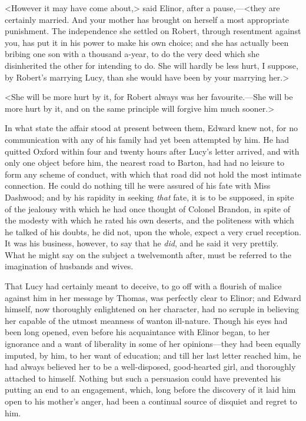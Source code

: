 <However it may have come about,> said Elinor, after a pause,—<they are certainly married. And your mother has brought on herself a most appropriate punishment. The independence she settled on Robert, through resentment against you, has put it in his power to make his own choice; and she has actually been bribing one son with a thousand a-year, to do the very deed which she disinherited the other for intending to do. She will hardly be less hurt, I suppose, by Robert's marrying Lucy, than she would have been by your marrying her.>

<She will be more hurt by it, for Robert always was her favourite.—She will be more hurt by it, and on the same principle will forgive him much sooner.>

In what state the affair stood at present between them, Edward knew not, for no communication with any of his family had yet been attempted by him. He had quitted Oxford within four and twenty hours after Lucy's letter arrived, and with only one object before him, the nearest road to Barton, had had no leisure to form any scheme of conduct, with which that road did not hold the most intimate connection. He could do nothing till he were assured of his fate with Miss Dashwood; and by his rapidity in seeking \textit{that} fate, it is to be supposed, in spite of the jealousy with which he had once thought of Colonel Brandon, in spite of the modesty with which he rated his own deserts, and the politeness with which he talked of his doubts, he did not, upon the whole, expect a very cruel reception. It was his business, however, to say that he \textit{did}, and he said it very prettily. What he might say on the subject a twelvemonth after, must be referred to the imagination of husbands and wives.

That Lucy had certainly meant to deceive, to go off with a flourish of malice against him in her message by Thomas, was perfectly clear to Elinor; and Edward himself, now thoroughly enlightened on her character, had no scruple in believing her capable of the utmost meanness of wanton ill-nature. Though his eyes had been long opened, even before his acquaintance with Elinor began, to her ignorance and a want of liberality in some of her opinions—they had been equally imputed, by him, to her want of education; and till her last letter reached him, he had always believed her to be a well-disposed, good-hearted girl, and thoroughly attached to himself. Nothing but such a persuasion could have prevented his putting an end to an engagement, which, long before the discovery of it laid him open to his mother's anger, had been a continual source of disquiet and regret to him.

